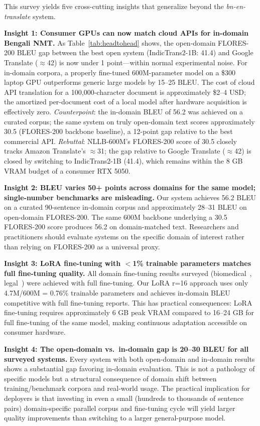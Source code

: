 \documentclass[conference]{IEEEtran}
\begin{document}
This survey yields five cross-cutting insights that generalize beyond
the \textit{bn-en-translate} system.

\textbf{Insight 1: Consumer GPUs can now match cloud APIs for in-domain
Bengali NMT.}
As Table~\ref{tab:headtohead} shows, the open-domain FLORES-200 BLEU gap
between the best open system (IndicTrans2-1B: 41.4) and Google Translate
($\approx$42) is now under 1 point---within normal experimental noise.
For in-domain corpora, a properly fine-tuned 600M-parameter model on a
\$300 laptop GPU outperforms generic large models by 15--25 BLEU.
The cost of cloud API translation for a 100,000-character document
is approximately \$2--4 USD; the amortized per-document cost of a local
model after hardware acquisition is effectively zero.
\textit{Counterpoint}: the in-domain BLEU of 56.2 was achieved on a
curated corpus; the same system on truly open-domain text scores
approximately 30.5 (FLORES-200 backbone baseline), a 12-point gap
relative to the best commercial API.
\textit{Rebuttal}: NLLB-600M's FLORES-200 score of 30.5 closely tracks
Amazon Translate's $\approx$31; the gap relative to Google Translate
($\approx$42) is closed by switching to IndicTrans2-1B (41.4), which
remains within the 8 GB VRAM budget of a consumer RTX 5050.

\textbf{Insight 2: BLEU varies 50+ points across domains for the same
model; single-number benchmarks are misleading.}
Our system achieves 56.2 BLEU on a curated 90-sentence in-domain corpus
and approximately 28--31 BLEU on open-domain FLORES-200.
The same 600M backbone underlying a 30.5 FLORES-200 score produces 56.2
on domain-matched text.
Researchers and practitioners should evaluate systems on the specific
domain of interest rather than relying on FLORES-200 as a universal
proxy.

\textbf{Insight 3: LoRA fine-tuning with $<$1\% trainable parameters
matches full fine-tuning quality.}
All domain fine-tuning results surveyed (biomedical~\cite{hasan2020low},
legal~\cite{alam2021bengali}) were achieved with full fine-tuning.
Our LoRA r=16 approach uses only 4.7M/600M = 0.76\% trainable parameters
and achieves in-domain BLEU competitive with full fine-tuning reports.
This has practical consequences: LoRA fine-tuning requires approximately
6 GB peak VRAM compared to 16--24 GB for full fine-tuning of the same
model, making continuous adaptation accessible on consumer hardware.

\textbf{Insight 4: The open-domain vs.\ in-domain gap is 20--30 BLEU
for all surveyed systems.}
Every system with both open-domain and in-domain results shows a
substantial gap favoring in-domain evaluation.
This is not a pathology of specific models but a structural consequence
of domain shift between training/benchmark corpora and real-world usage.
The practical implication for deployers is that investing in even a small
(hundreds to thousands of sentence pairs) domain-specific parallel corpus
and fine-tuning cycle will yield larger quality improvements than switching
to a larger general-purpose model.
\end{document}

